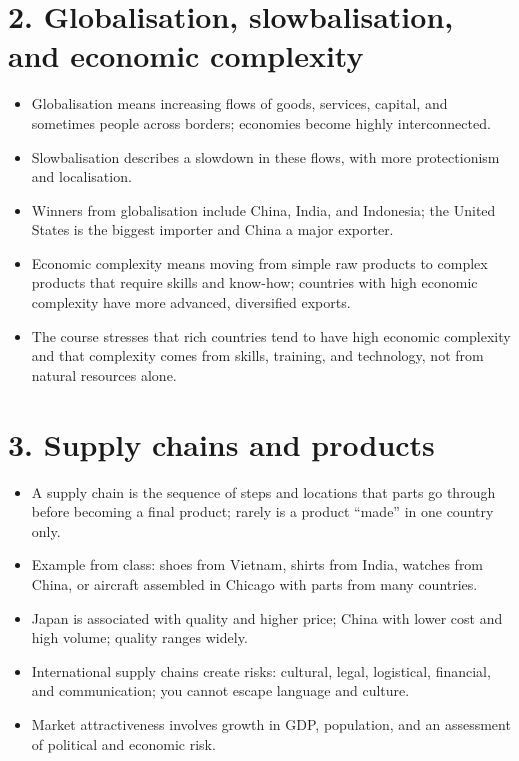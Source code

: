 \documentclass[10pt,a4paper]{article}
\begin{document}
\section*{2. Globalisation, slowbalisation, and economic complexity}
\begin{itemize}
\item Globalisation means increasing flows of goods, services, capital, and sometimes people across borders; economies become highly interconnected.
\item Slowbalisation describes a slowdown in these flows, with more protectionism and localisation.
\item Winners from globalisation include China, India, and Indonesia; the United States is the biggest importer and China a major exporter.
\item Economic complexity means moving from simple raw products to complex products that require skills and know-how; countries with high economic complexity have more advanced, diversified exports.
\item The course stresses that rich countries tend to have high economic complexity and that complexity comes from skills, training, and technology, not from natural resources alone.
\end{itemize}

\section*{3. Supply chains and products}
\begin{itemize}
\item A supply chain is the sequence of steps and locations that parts go through before becoming a final product; rarely is a product “made” in one country only.
\item Example from class: shoes from Vietnam, shirts from India, watches from China, or aircraft assembled in Chicago with parts from many countries.
\item Japan is associated with quality and higher price; China with lower cost and high volume; quality ranges widely.
\item International supply chains create risks: cultural, legal, logistical, financial, and communication; you cannot escape language and culture.
\item Market attractiveness involves growth in GDP, population, and an assessment of political and economic risk.
\end{itemize}
\end{document}
